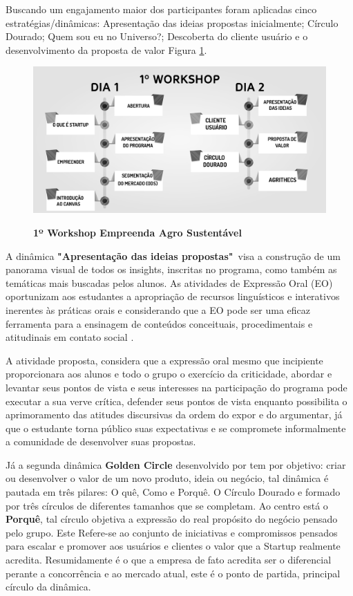 Buscando um engajamento maior dos participantes foram
aplicadas cinco estratégias/dinâmicas: Apresentação das ideias propostas inicialmente; Círculo Dourado;
Quem sou eu no Universo?; Descoberta do cliente usuário e o  desenvolvimento da proposta de valor Figura \ref{figura_30}.

\begin{figure}[!h]
\centering
\caption{\textbf{1º Workshop Empreenda Agro Sustentável}}
\includegraphics[scale=0.3]{Imagens/1_workshop.png}
\label{figura_30}
\end{figure}

A dinâmica \textbf{"Apresentação das ideias propostas"}\ visa a construção de um panorama visual de todos os insights, inscritas no programa, como também as temáticas mais buscadas pelos alunos. As atividades de Expressão Oral (EO) oportunizam aos estudantes a apropriação de recursos linguísticos e interativos inerentes às práticas orais e considerando que a EO pode ser uma eficaz ferramenta para a ensinagem de conteúdos conceituais, procedimentais e atitudinais em contato social \cite{baltar_genero_2010}.

A atividade proposta, considera que a expressão oral mesmo que incipiente proporcionara aos alunos e todo o grupo o exercício da criticidade, abordar e levantar seus pontos de vista e seus interesses na participação do programa pode executar a sua verve crítica, defender seus pontos de vista enquanto possibilita o aprimoramento das atitudes discursivas da ordem do expor e do argumentar, já que o estudante torna público suas expectativas e se compromete informalmente a comunidade de desenvolver suas propostas. 

Já a segunda dinâmica \textbf{Golden Circle} desenvolvido por  tem por objetivo: criar ou desenvolver o valor de um novo produto, ideia ou negócio, tal dinâmica é pautada em três pilares: O quê, Como e Porquê. O Círculo Dourado e formado por três círculos de diferentes tamanhos que se completam. Ao centro está o \textbf{Porquê}, tal círculo objetiva a expressão do real propósito do negócio pensado pelo grupo. Este Refere-se ao conjunto de iniciativas e compromissos pensados para escalar e promover aos usuários e clientes o valor que a Startup realmente acredita. Resumidamente é o que a empresa de fato acredita ser o  diferencial perante a concorrência e ao mercado atual, este é o ponto de partida, principal círculo da dinâmica. 


